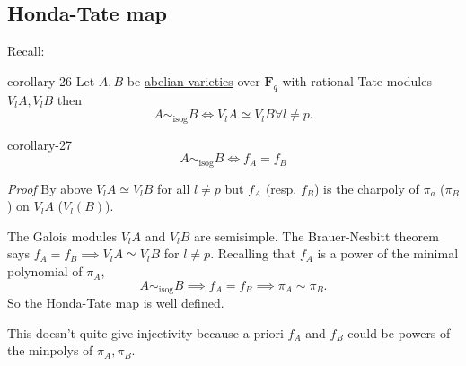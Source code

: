 \documentclass[10pt,]{book}
\makeatletter
\renewcommand*{\proofname}{Proof}
\renewenvironment{proof}[1][\proofname]{\par
  \pushQED{\qed}%
  \normalfont \topsep6\p@\@plus6\p@\relax
  \trivlist
  \item\relax
    {\itshape
    #1\@addpunct{.}}\hspace\labelsep\ignorespaces
}{%
  \popQED\endtrivlist\@endpefalse
}
\numberwithin{equation}{section}
\newcommand{\FF}{\mathbf{F}}
\makeatother
\begin{document}
\subsection[{Honda-Tate map}]{Honda-Tate map}\label{subsection-35}
\hypertarget{p-409}{}%
Recall:%
\begin{corollary}{}{}{corollary-26}%
\hypertarget{p-410}{}%
Let \(A,B\) be \hyperref[def-buntes-abvar]{abelian varieties} over \(\FF_q\) with rational Tate modules \(V_l A, V_lB\) then%
\begin{equation*}
A\sim_{\text{isog}} B \iff V_l A \simeq V_l B \forall l \ne p\text{.}
\end{equation*}
%
\end{corollary}
\begin{corollary}{}{}{corollary-27}%
\hypertarget{p-411}{}%
%
\begin{equation*}
A\sim_{\text{isog}} B \iff f_A = f_B
\end{equation*}
%
\end{corollary}
\begin{proof}\hypertarget{proof-70}{}
\hypertarget{p-412}{}%
By above \(V_l A \simeq V_lB\) for all \(l \ne p\) but \(f_A\) (resp. \(f_B\)) is the charpoly of \(\pi_a\) (\(\pi_B\)) on \(V_l A\) (\(V_l(B)\)).%
\par
\hypertarget{p-413}{}%
The Galois modules \(V_lA\) and \(V_l B\) are semisimple. The Brauer-Nesbitt theorem says \(f_A = f_B \implies V_lA \simeq V_lB \) for \(l\ne p\).%
\end{proof}
\hypertarget{p-414}{}%
Recalling that \(f_A\) is a power of the minimal polynomial of \(\pi_A\),%
\begin{equation*}
A \sim_{\text{isog}} B\implies  f_A =f_B \implies \pi_A \sim \pi_B\text{.}
\end{equation*}
So the Honda-Tate map is well defined.%
\par
\hypertarget{p-415}{}%
This doesn't quite give injectivity because a priori \(f_A\) and \(f_B\) could be powers of the minpolys of \(\pi_A, \pi_B\).%
%
%
\typeout{************************************************}
\typeout{************************************************}
%
\end{document}
